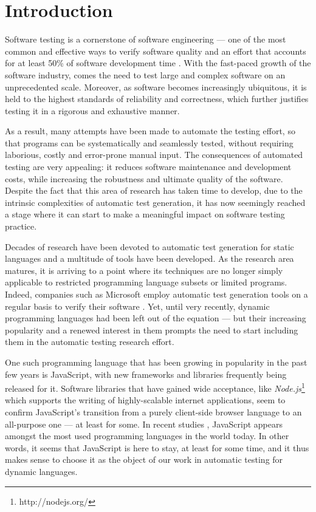 \chapter{Introduction}
\pagestyle{plain}
\setcounter{page}{1}
Software testing is a cornerstone of software engineering --- one of the most common and effective ways to verify software quality and an effort that accounts for at least 50\% of software development time \cite{tahbildar2automated}. With the fast-paced growth of the software industry, comes the need to test large and complex software on an unprecedented scale. Moreover, as software becomes increasingly ubiquitous, it is held to the highest standards of reliability and correctness, which further justifies testing it in a rigorous and exhaustive manner.

As a result, many attempts have been made to automate the testing effort, so that programs can be systematically and seamlessly tested, without requiring laborious, costly and error-prone manual input. The consequences of automated testing are very appealing: it reduces software maintenance and development costs, while increasing the robustness and ultimate quality of the software. Despite the fact that this area of research has taken time to develop, due to the intrinsic complexities of automatic test generation, it has now seemingly reached a stage where it can start to make a meaningful impact on software testing practice.

Decades of research have been devoted to automatic test generation for static languages and a multitude of tools have been developed. As the research area matures, it is arriving to a point where its techniques are no longer simply applicable to restricted programming language subsets or limited programs. Indeed, companies such as Microsoft employ automatic test generation tools on a regular basis to verify their software \cite{păsăreanu2009survey}. Yet, until very recently, dynamic programming languages had been left out of the equation --- but their increasing popularity and a renewed interest in them prompts the need to start including them in the automatic testing research effort.

One such programming language that has been growing in popularity in the past few years is JavaScript, with new frameworks and libraries frequently being released for it. Software libraries that have gained wide acceptance, like \emph{Node.js}\footnote{http://nodejs.org/} which supports the writing of highly-scalable internet applications, seem to confirm JavaScript's transition from a purely client-side browser language to an all-purpose one --- at least for some. In recent studies \cite{website:langpop}, JavaScript appears amongst the most used programming languages in the world today. In other words, it seems that JavaScript is here to stay, at least for some time, and it thus makes sense to choose it as the object of our work in automatic testing for dynamic languages.

